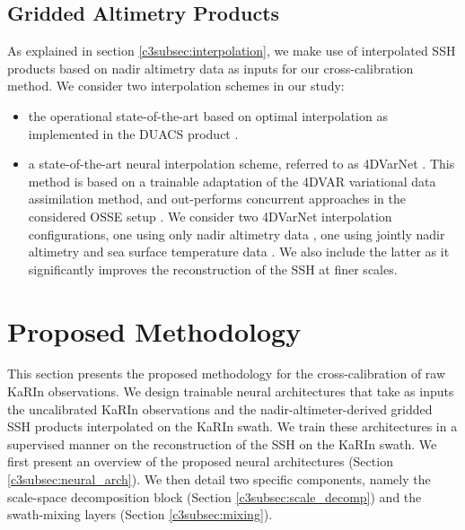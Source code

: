 \begin{bibunit}
\subsection*{Gridded Altimetry Products}
\label{c3subsec:mapping}
\noindent
As explained in section \ref{c3subsec:interpolation}, we make use of interpolated SSH products based on
nadir altimetry data as inputs for our cross-calibration method.
We consider two interpolation schemes in our study:
\begin{itemize}
    \item the operational state-of-the-art based on optimal interpolation as implemented in the DUACS product \cite{taburet_duacs_2019}.
    \item a state-of-the-art neural interpolation scheme, referred to as 4DVarNet \cite{fablet_joint_2021}. This method is based on a trainable adaptation of the 4DVAR \cite{carrassi_data_2018} variational data assimilation method, and out-performs concurrent approaches in the considered OSSE setup \cite{osse_data_challenge}. We consider two 4DVarNet interpolation configurations, one using only nadir altimetry data \cite{Beauchamp_Febvre_Georgenthum_Fablet_2022}, one using jointly nadir altimetry and sea surface temperature data \cite{Fablet_Febvre_Chapron_2022}. We also include the latter as it significantly improves the reconstruction of the SSH at finer scales.
    
\end{itemize}

\section{Proposed Methodology}
\label{c3sec:method}
\noindent


This section presents the proposed methodology for the cross-calibration of raw KaRIn observations.
We design trainable neural architectures that take as inputs the uncalibrated KaRIn observations and the nadir-altimeter-derived gridded SSH products interpolated on the KaRIn swath. We train these architectures in a supervised manner on the reconstruction of the SSH on the KaRIn swath.
We first present an overview of the proposed neural architectures (Section \ref{c3subsec:neural_arch}). We then detail two specific components, namely the  scale-space decomposition block (Section \ref{c3subsec:scale_decomp}) and the swath-mixing layers (Section \ref{c3subsec:mixing}).


\end{bibunit}
